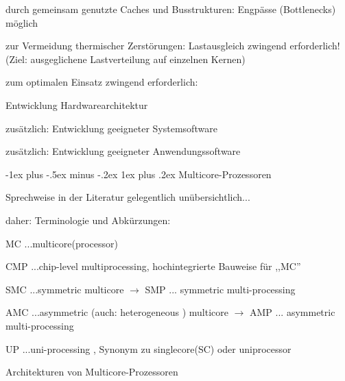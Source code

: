 \documentclass[a4paper]{article}
\makeatletter
\renewcommand{\subsubsection}{\@startsection{subsubsection}{3}{0mm}%
 {-1ex plus -.5ex minus -.2ex}%
 {1ex plus .2ex}%
 {\normalfont\small\bfseries}}
\makeatother
\begin{document}
\begin{multicols}{3}
    \begin{enumerate*}
        \item
        durch gemeinsam genutzte Caches und Busstrukturen: Engpässe
        (Bottlenecks) möglich
        \item
        zur Vermeidung thermischer Zerstörungen: Lastausgleich zwingend
        erforderlich! (Ziel: ausgeglichene Lastverteilung auf einzelnen
        Kernen)
        \item
        zum optimalen Einsatz zwingend erforderlich:
        \begin{enumerate*}
            \item Entwicklung Hardwarearchitektur
            \item zusätzlich: Entwicklung geeigneter Systemsoftware
            \item zusätzlich: Entwicklung geeigneter Anwendungssoftware
        \end{enumerate*}
    \end{enumerate*}


    \subsubsection{Multicore-Prozessoren}

    \begin{itemize*}
        \item
        Sprechweise in der Literatur gelegentlich unübersichtlich...
        \item
        daher: Terminologie und Abkürzungen:
        \begin{itemize*}
            \item MC ...multicore(processor)
            \item CMP ...chip-level multiprocessing, hochintegrierte Bauweise für ,,MC''
            \item SMC ...symmetric multicore $\rightarrow$ SMP ... symmetric multi-processing
            \item AMC ...asymmetric (auch: heterogeneous ) multicore $\rightarrow$ AMP ... asymmetric multi-processing
            \item UP ...uni-processing , Synonym zu singlecore(SC) oder uniprocessor
        \end{itemize*}
    \end{itemize*}

    Architekturen von Multicore-Prozessoren


\end{multicols}
\end{document}
